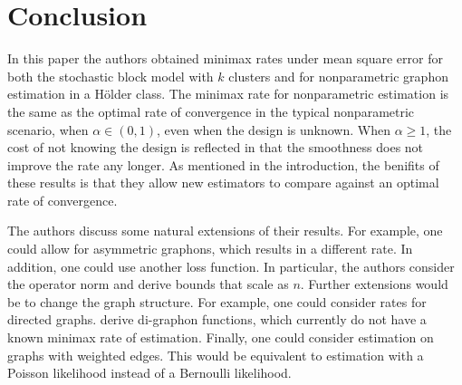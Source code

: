 \documentclass[11pt]{article}
\begin{document}
\section{Conclusion}\label{sec:conclusion}

In this paper the authors obtained minimax rates under mean square error for both the stochastic block model with $k$ clusters and for nonparametric graphon estimation in a H\"older class. The minimax rate for nonparametric estimation is the same as the optimal rate of convergence in the typical nonparametric scenario, when $\alpha \in (0,1)$, even when the design is unknown. When $\alpha \geq 1$, the cost of not knowing the design is reflected in that the smoothness does not improve the rate any longer. As mentioned in the introduction, the benifits of these results is that they allow new estimators to compare against an optimal rate of convergence.

The authors discuss some natural extensions of their results. For example, one could allow for asymmetric graphons, which results in a different rate. In addition, one could use another loss function. In particular, the authors consider the operator norm and derive bounds that scale as $n$. Further extensions would be to change the graph structure. For example, one could consider rates for directed graphs. \citep{cai2016digraphon} derive di-graphon functions, which currently do not have a known minimax rate of estimation. Finally, one could consider estimation on graphs with weighted edges. This would be equivalent to estimation with a Poisson likelihood instead of a Bernoulli likelihood.




\end{document}
